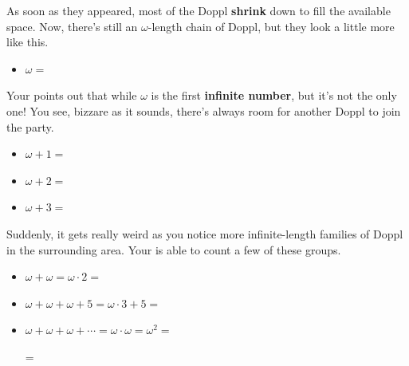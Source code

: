 As soon as they appeared, most of the Doppl \textbf{shrink} down to fill the
available space. Now, there's still an \(\omega\)-length chain of Doppl, but
they look a little more like this.

\begin{itemize}
\item \(\omega=\) \mappDopplOmega
\end{itemize}

Your \mappMobidex{} points out that while \(\omega\) is the first
\textbf{infinite number}, but it's not the only one!
You see, bizzare as it sounds, there's always room for another
Doppl to join the party.

\begin{itemize}
\item\(\omega+1=\) \mappDopplOmega\mappDoppl

\item\(\omega+2=\) \mappDopplOmega\mappDoppl\mappDoppl

\item\(\omega+3=\) \mappDopplOmega\mappDoppl\mappDoppl\mappDoppl
\end{itemize}

Suddenly, it gets really weird as you notice more infinite-length families
of Doppl in the surrounding area. Your \mappMobidex{} is able to count
a few of these groups.

\begin{itemize}
\item \(\omega+\omega=\omega\cdot2=\) \mappDopplOmega\mappDopplOmega

\item \(\omega+\omega+\omega+5=\omega\cdot 3 + 5=\) \mappDopplOmega\mappDopplOmega\mappDopplOmega\mappDoppl\mappDoppl\mappDoppl\mappDoppl\mappDoppl

\item \(\omega+\omega+\omega+\cdots=\omega\cdot\omega=\omega^2=\)
\mappDopplOmega\mappDopplOmega\mappDopplOmega\mappDopplOmega\mappDopplOmega
\mappDopplOmega\mappDopplOmega\mappDopplOmega\mappDopplOmega\mappDopplOmega
\mappDopplOmega\mappDopplOmega\mappDopplOmega\mappDopplOmega\mappDopplOmega
\mappDopplOmega\mappDopplOmega\mappDopplOmega\mappDopplOmega\mappDopplOmega
\mappDopplOmega\mappDopplOmega\mappDopplOmega\mappDopplOmega\mappDopplOmega
\mappDopplOmega\mappDopplOmega\mappDopplOmega\mappDopplOmega\mappDopplOmega
\mappDopplOmega\mappDopplOmega\mappDopplOmega\mappDopplOmega\mappDopplOmega
\mappDopplOmega\mappDopplOmega\mappDopplOmega\mappDopplOmega\mappDopplOmega

= \mappDopplOmegaSquared
\end{itemize}


